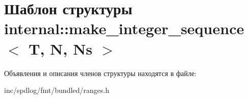 \hypertarget{structinternal_1_1make__integer__sequence}{}\section{Шаблон структуры internal\+:\+:make\+\_\+integer\+\_\+sequence$<$ T, N, Ns $>$}
\label{structinternal_1_1make__integer__sequence}


Объявления и описания членов структуры находятся в файле\+:\begin{DoxyCompactItemize}
\item 
inc/spdlog/fmt/bundled/ranges.\+h\end{DoxyCompactItemize}
